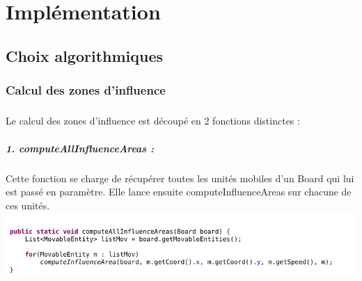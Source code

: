 \chapter{Implémentation}
	
	\section{Choix algorithmiques}

		\subsection{Calcul des zones d'influence}
		
			\paragraph{}
			Le calcul des zones d'influence est découpé en 2 fonctions distinctes :
			
			\paragraph{1. computeAllInfluenceAreas : }
			Cette fonction se charge de récupérer toutes les unités mobiles d'un Board qui lui est passé en paramètre.
			Elle lance ensuite computeInfluenceAreas sur chacune de ces unités.\\
			\includegraphics[scale=0.4]{images/implementation/computeAllInfluenceAreas.png}
			
